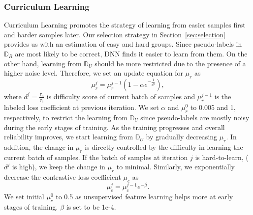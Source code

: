 \documentclass[10pt,twocolumn,letterpaper]{article}
\begin{document}
\subsubsection{Curriculum Learning}
\vspace{-1mm}
Curriculum Learning \cite{bengio2009curriculum,zhou2018minimax} promotes the strategy of learning from easier samples first and harder samples later. Our selection strategy in Section~\ref{sec:selection} provides us with an estimation of easy and hard groups. Since pseudo-labels in $\mathbb{D}_R$ are most likely to be correct, DNN finds it easier to learn from them. On the other hand, learning from $\mathbb{D}_U$ should be more restricted due to the presence of a higher noise level. Therefore, we set an update equation for $\mu_r$ as 
\begin{equation}
    \mu_r^{j} = \mu_r^{j-1}(1- \alpha e^{-\frac{1}{d^{j}}}),\label{eq:loss_coeff}
\end{equation}
where $d^{j} = \frac{\tau_u}{\tau_c}$ is difficulty score of current batch of samples and $\mu_r^{j-1}$ is the labeled loss coefficient at previous iteration. We set $\alpha$ and $\mu_r^{0}$ to 0.005 and 1, respectively, to restrict the learning from $\mathbb{D}_U$ since pseudo-labels are mostly noisy during the early stages of training. As the training progresses and overall reliability improves, we start learning from $\mathbb{D}_U$ by gradually decreasing $\mu_r$. In addition, the change in $\mu_r$ is directly controlled by the difficulty in learning the current batch of samples. If the batch of samples at iteration $j$ is hard-to-learn, (\ie $d^j$ is high), we keep the change in $\mu_r$ to minimal. Similarly, we exponentially decrease the contrastive loss coefficient $\mu_c$ as  
\begin{equation}
    \mu_c^{j} = \mu_c^{j-1}e^{-\beta}.\label{eq:con_loss_coeff}
\end{equation}
We set initial $\mu_c^{0}$ to 0.5 as unsupervised feature learning helps more at early stages of training. $\beta$ is set to be 1e-4. 

\vspace{-2mm}
\end{document}
